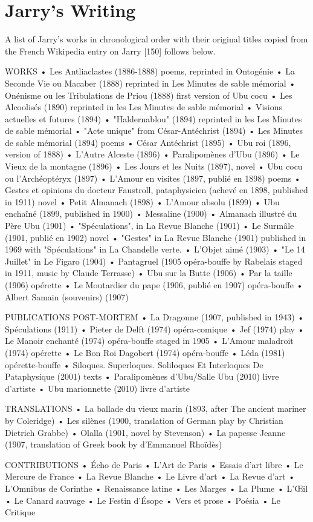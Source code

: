 
\chapter{Jarry's Writing}
\label{app:jarry}

A list of Jarry’s works in chronological order with their original titles copied from the French Wikipedia entry on Jarry [150] follows below.

WORKS
•	Les Antliaclastes (1886-1888) poems, reprinted in Ontogénie
•	La Seconde Vie ou Macaber (1888) reprinted in Les Minutes de sable mémorial
•	Onénisme ou les Tribulations de Priou (1888) first version of Ubu cocu
•	Les Alcoolisés (1890) reprinted in les Les Minutes de sable mémorial
•	Visions actuelles et futures (1894)
•	"Haldernablou" (1894) reprinted in les Les Minutes de sable mémorial
•	"Acte unique" from César-Antéchrist (1894)
•	Les Minutes de sable mémorial (1894) poems
•	César Antéchrist (1895)
•	Ubu roi (1896, version of 1888)
•	L’Autre Alceste (1896)
•	Paralipomènes d’Ubu (1896)
•	Le Vieux de la montagne (1896)
•	Les Jours et les Nuits (1897), novel
•	Ubu cocu ou l'Archéoptéryx (1897)
•	L’Amour en visites (1897, publié en 1898) poems
•	Gestes et opinions du docteur Faustroll, pataphysicien (achevé en 1898, published in 1911) novel
•	Petit Almanach (1898)
•	L’Amour absolu (1899)
•	Ubu enchaîné (1899, published in 1900)
•	Messaline (1900)
•	Almanach illustré du Père Ubu (1901)
•	"Spéculations", in La Revue Blanche (1901)
•	Le Surmâle (1901, publié en 1902) novel
•	"Gestes" in La Revue Blanche (1901) published in 1969 with "Spéculations" in  La Chandelle verte.
•	L’Objet aimé (1903)
•	"Le 14 Juillet" in Le Figaro (1904)
•	Pantagruel (1905 opéra-bouffe by Rabelais staged in 1911, music by Claude Terrasse)
•	Ubu sur la Butte (1906)
•	Par la taille (1906) opérette
•	Le Moutardier du pape (1906, publié en 1907) opéra-bouffe
•	Albert Samain (souvenirs) (1907)

PUBLICATIONS POST-MORTEM
•	La Dragonne (1907, published in 1943)
•	Spéculations (1911)
•	Pieter de Delft (1974) opéra-comique
•	Jef (1974) play
•	Le Manoir enchanté (1974) opéra-bouffe staged in 1905
•	L’Amour maladroit (1974) opérette
•	Le Bon Roi Dagobert (1974) opéra-bouffe
•	Léda (1981) opérette-bouffe
•	Siloques. Superloques. Soliloques Et Interloques De Pataphysique (2001) texts
•	Paralipomènes d'Ubu/Salle Ubu (2010) livre d'artiste
•	Ubu marionnette (2010) livre d'artiste

TRANSLATIONS
•	La ballade du vieux marin (1893, after The ancient mariner by Coleridge)
•	Les silènes (1900, translation of German play by Christian Dietrich Grabbe)
•	Olalla (1901, novel by Stevenson)
•	La papesse Jeanne (1907, translation of Greek book by d’Emmanuel Rhoïdès)

CONTRIBUTIONS
•	Écho de Paris
•	L’Art de Paris
•	Essais d’art libre
•	Le Mercure de France
•	La Revue Blanche
•	Le Livre d’art
•	La Revue d’art
•	L’Omnibus de Corinthe
•	Renaissance latine
•	Les Marges
•	La Plume
•	L'Œil
•	Le Canard sauvage
•	Le Festin d'Ésope
•	Vers et prose
•	Poésia
•	Le Critique
